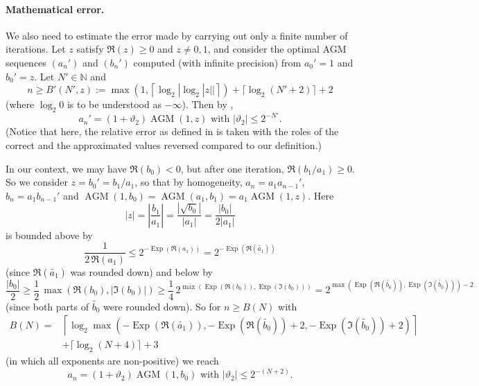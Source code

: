 \documentclass [11pt]{article}
\newcommand {\corr}[1]{{#1}}
\newcommand {\appro}[1]{\widetilde {#1}}
\DeclareMathOperator{\Exp}{\operatorname {Exp}}
\newcommand {\N}{\mathbb N}
\renewcommand {\theta}{\vartheta}
\renewcommand {\leq}{\leqslant}
\renewcommand {\geq}{\geqslant}
\newcommand {\AGM}{\operatorname{AGM}}
\begin{document}
\paragraph {Mathematical error.}

We also need to estimate the error made by carrying out only a finite number
of iterations. Let $z$ satisfy $\Re (z) \geq 0$ and $z \neq 0, 1$, and
consider the optimal AGM sequences $(a_n')$ and $(b_n')$ computed (with
infinite precision) from $a_0' = 1$ and $b_0' = z$. Let $N' \in \N$ and
\[
n \geq B' (N', z)
  := \max \left( 1, \left\lceil \log_2 |\log_2 |z|| \right\rceil \right)
        + \lceil \log_2 (N'+2) \rceil + 2
\]
(where $\log_2 0$ is to be understood as $- \infty$).
Then by \cite[Prop.~3.3, p.~88]{Dupont06},
\[
a_n' = (1 + \theta_2) \AGM (1, z)
\text { with }
|\theta_2| \leq 2^{-N'}.
\]
(Notice that here, the relative error as defined in
\cite[Def.~1.2, p.~20]{Dupont06} is taken with the roles of the correct
and the approximated values reversed compared to our definition.)

In our context, we may have $\Re (\corr {b_0}) < 0$, but after one iteration,
$\Re (\corr {b_1} / \corr {a_1}) \geq 0$. So we consider
$\corr {z} = b_0' = \corr {b_1} / \corr {a_1}$, so that by
homogeneity, $\corr {a_n} = \corr {a_1} a_{n-1}'$,
$\corr {b_n} = \corr {a_1} b_{n-1}'$ and
$\AGM (1, \corr {b_0}) = \AGM (\corr {a_1}, \corr {b_1})
= \corr {a_1} \AGM (1, \corr {z})$.
Here
\[
|z|
= \left| \frac {\corr {b_1}}{\corr {a_1}} \right|
= \frac {|\sqrt {\corr {b_0}}|}{|\corr {a_1}|}
= \frac {|\corr {b_0}|}{2 |\corr {a_1}|}
\]
is bounded above by
\[
\frac {1}{2 \, \Re (\corr {a_1})}
\leq
2^{- \Exp (\Re (\corr {a_1}))}
=
2^{- \Exp (\Re (\appro {a_1}))}
\]
(since $\Re (\appro {a_1})$ was rounded down)
and below by
\[
\frac {|\corr {b_0}|}{2}
\geq
\frac {1}{2} \, \max \left( \Re (\corr {b_0}), |\Im (\corr {b_0})| \right)
\geq
\frac {1}{4} \,
2^{\max \left( \Exp (\Re (\corr {b_0})), \Exp (\Im (\corr {b_0})) \right)}
=
2^{\max \left( \Exp (\Re (\appro {b_0})), \Exp (\Im (\appro {b_0})) \right)
- 2}
\]
(since both parts of $\appro {b_0}$ were rounded down).
So for $n \geq B (N)$ with
\begin{equation}
\label{eq:agmbound}
\begin {aligned}
B (N)
  = & \left\lceil \log_2 \max (- \Exp (\Re (\appro {a_1})),
                             - \Exp (\Re (\appro {b_0})) + 2,
                             - \Exp (\Im (\appro {b_0})) + 2
                             ) \right\rceil \\
    & + \lceil \log_2 (N+4) \rceil + 3
\end {aligned}
\end{equation}
(in which all exponents are non-positive)
we reach
\[
\corr {a_n} = (1 + \theta_2) \AGM (1, \corr {b_0})
\text { with }
|\theta_2| \leq 2^{-(N+2)}.
\]
\end{document}
